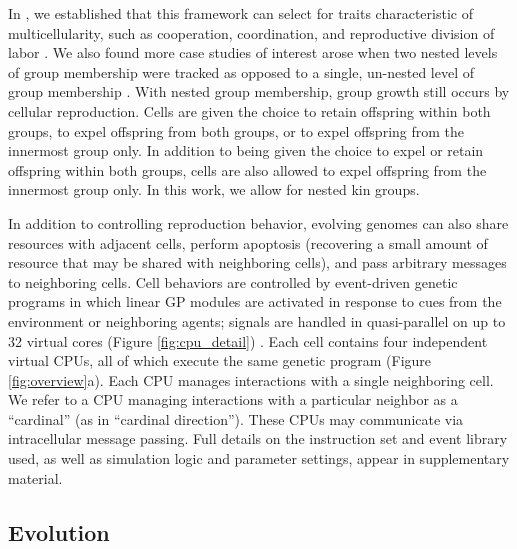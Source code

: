 In , we established that this framework can select for traits characteristic of multicellularity, such as cooperation, coordination, and reproductive division of labor .
We also found more case studies of interest arose when two nested levels of group membership were tracked
as opposed to a single, un-nested level of group membership .
With nested group membership, group growth still occurs by cellular reproduction.
Cells are given the choice to retain offspring within both groups, to expel offspring from both groups, or to expel offspring from the innermost group only.
In addition to being given the choice to expel or retain offspring within both groups, cells are also allowed to expel offspring from the innermost group only.
In this work, we allow for nested kin groups.

In addition to controlling reproduction behavior, evolving genomes can also share resources with adjacent cells, perform apoptosis (recovering a small amount of resource that may be shared with neighboring cells), and pass arbitrary messages to neighboring cells.
Cell behaviors are controlled by event-driven genetic programs in which linear GP modules are activated in response to cues from the environment or neighboring agents; signals are handled in quasi-parallel on up to 32 virtual cores (Figure \ref{fig:cpu_detail}) \citep{lalejini2018evolving}.
Each cell contains four independent virtual CPUs, all of which execute the same genetic program (Figure \ref{fig:overview}a).
Each CPU manages interactions with a single neighboring cell.
We refer to a CPU managing interactions with a particular neighbor as a ``cardinal'' (as in ``cardinal direction'').
These CPUs may communicate via intracellular message passing.
Full details on the instruction set and event library used, as well as simulation logic and parameter settings, appear in supplementary material.


\subsection{Evolution}
\label{sec:evolution;ch:measuring-cna}

